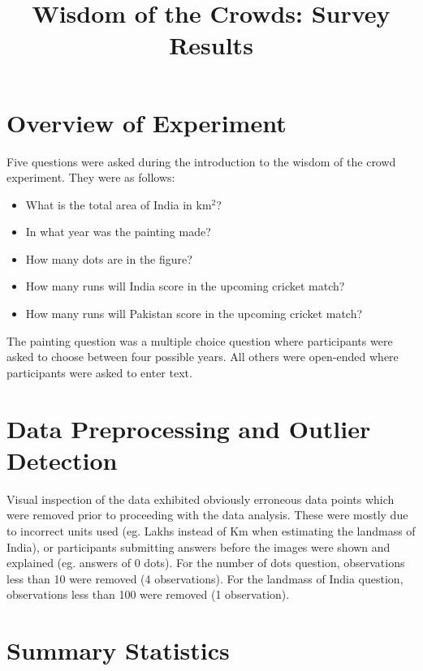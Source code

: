 \documentclass{article}
\date{}
\begin{document}
\title{Wisdom of the Crowds: Survey Results}
\maketitle




\section*{Overview of Experiment}

Five questions were asked during the introduction to the wisdom of the crowd experiment. They were as follows: 
\begin{itemize}
\item What is the total area of India in km$^{2}$?
\item In what year was the painting made? 
\item How many dots are in the figure?
\item How many runs will India score in the upcoming cricket match?
\item How many runs will Pakistan score in the upcoming cricket match?
\end{itemize}

The painting question was a multiple choice question where participants were asked to choose between four possible years. All others were open-ended where participants were asked to enter text. \\


\section*{Data Preprocessing and Outlier Detection}

Visual inspection of the data exhibited obviously erroneous data points which were removed prior to proceeding with the data analysis. These were mostly due to incorrect units used (eg. Lakhs instead of Km when estimating the landmass of India), or participants submitting answers before the images were shown and explained (eg. answers of 0 dots). For the number of dots question, observations less than 10 were removed (4 observations). For the landmass of India question, observations less than 100 were removed (1 observation).\\



\section*{Summary Statistics}
\end{document}
